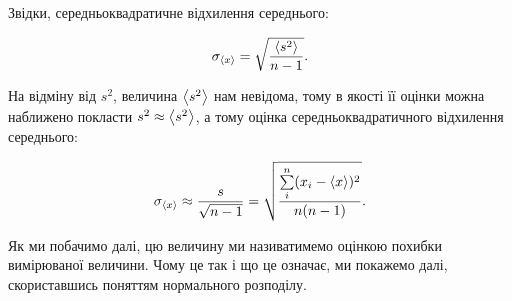 \documentclass{LabBook}
\begin{document}
  Звідки, середньоквадратичне відхилення середнього:





  \begin{equation}\label{eq:averrorest}
    \sigma_{\left\langle x \right\rangle} = \sqrt{\frac{\left\langle s^2 \right\rangle}{n-1}}.
  \end{equation}

  На відміну від $s^2$, величина $\left\langle s^2 \right\rangle$ нам невідома, тому в якості її оцінки можна наближено покласти $s^2 \approx \left\langle s^2 \right\rangle$, а тому оцінка середньоквадратичного відхилення середнього:

  \begin{equation}\label{eq:averrorest_sim}
    \sigma_{\left\langle x \right\rangle} \approx \frac{s}{\sqrt{n-1}} = \sqrt{\frac{\sum\limits_i^n (x_i - \left\langle x \right\rangle)^2}{n(n - 1)}}.
  \end{equation}

  Як ми побачимо далі, цю величину ми називатимемо оцінкою похибки вимірюваної величини. Чому це так і що це означає, ми покажемо далі, скориставшись поняттям нормального розподілу.

\end{document}
